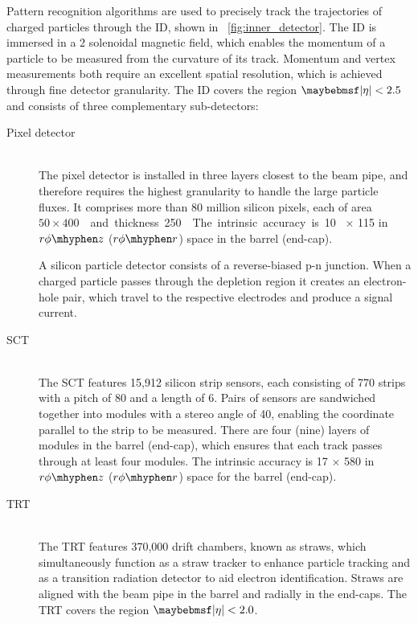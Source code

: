 Pattern recognition algorithms are used to precisely track the trajectories of charged 
particles through the \ac{ID}, shown in \Figure~\ref{fig:inner_detector}. The \ac{ID} is 
immersed in a \unit{2}{\tesla} solenoidal magnetic field, which enables the momentum of a 
particle to be measured from the curvature of its track. Momentum and vertex measurements
both require an excellent spatial resolution, which is achieved through fine detector 
granularity. The \ac{ID} covers the region $\mods{\eta} < 2.5$ and consists of three 
complementary sub-detectors:
\begin{description}
\item[Pixel detector] \hfill \\
	The pixel detector is installed in three layers closest to the beam pipe, and 
	therefore requires the highest granularity to handle the large particle fluxes.
	It comprises more than 80 million silicon pixels, each of area 
	\unit{$50 \times 400$}{\micro\metre\squared} and thickness \unit{250}{\micro\metre}. 
	The intrinsic accuracy is \unit{10}{\micro\metre}$\,\times\,$\unit{115}{\micro\metre} 
	in $r\phi \mhyphen z$ ($r\phi \mhyphen r$) space in the barrel (end-cap).

	A silicon particle detector consists of a reverse-biased p-n junction. When a charged
	particle passes through the depletion region it creates an electron-hole pair, which 
	travel to the respective electrodes and produce a signal current.
\item[\ac{SCT}] \hfill \\
	The \ac{SCT} features 15,912 silicon strip sensors, each consisting of 770 strips 
	with a pitch of \unit{80}{\micro\metre} and a length of \unit{6}{\centi\metre}. Pairs 
	of sensors are sandwiched together into modules with a stereo angle of 
	\unit{40}{\milli\radian}, enabling the coordinate parallel to the strip to be 
	measured. There are four (nine) layers of modules in the barrel (end-cap), which 
	ensures that each track passes through at least four modules. 
	The intrinsic accuracy is \unit{17}{\micro\metre}$\,\times\,$\unit{580}{\micro\metre} 
	in $r\phi \mhyphen z$ ($r\phi \mhyphen r$) space for the barrel (end-cap).
\item[\ac{TRT}] \hfill \\
	The \ac{TRT} features 370,000 drift chambers, known as straws, which simultaneously 
	function as a straw tracker to enhance particle tracking and as a transition 
	radiation detector to aid electron identification. Straws are aligned with the beam 
	pipe in the barrel and radially in the end-caps. The \ac{TRT} covers the region 
	$\mods{\eta} < 2.0$.


\end{description}
